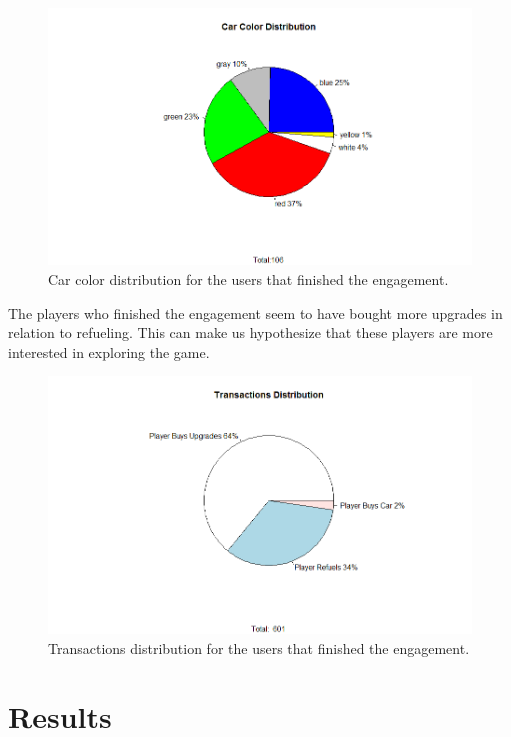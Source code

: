 \documentclass[preprint,authoryear,12pt]{elsarticle}
\begin{document}
\begin{figure}[htb]
	\begin{center}
		\includegraphics[width=.95\linewidth]{ijhcs14-img/Color}
		\caption{Car color distribution for the users that finished the engagement.\label{fig:engagementcolor}}
	\end{center}
\end{figure}

The players who finished the engagement seem to have bought more upgrades in relation to refueling. This can make us hypothesize that these players are more interested in exploring the game. 

\begin{figure}[htb]
	\begin{center}
		\includegraphics[width=.95\linewidth]{ijhcs14-img/Transactions}
		\caption{Transactions distribution for the users that finished the engagement.\label{fig:engagementtransactions}}
	\end{center}
\end{figure}


\section{Results}
\label{sec:result}
\end{document}
